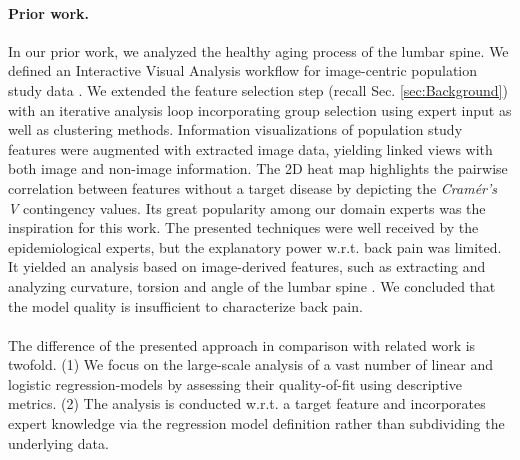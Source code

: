 \documentclass[journal]{style/vgtc} 			          %
\begin{document}
\paragraph{Prior work.}
In our prior work, we analyzed the healthy aging process of the lumbar spine.
We defined an Interactive Visual Analysis workflow for image-centric population study data \cite{Klemm2014VIS}.
We extended the feature selection step (recall Sec. \ref{sec:Background}) with an iterative analysis loop incorporating group selection using expert input as well as clustering methods.
Information visualizations of population study features were augmented with extracted image data, yielding linked views with both image and non-image information.
The 2D heat map \cite{Klemm2014VIS} highlights the pairwise correlation between features without a target disease by depicting the \emph{Cram\'{e}r's V} contingency values.
Its great popularity among our domain experts was the inspiration for this work.
The presented techniques were well received by the epidemiological experts, but the explanatory power w.r.t. back pain was limited.
It yielded an analysis based on image-derived features, such as extracting and analyzing curvature, torsion and angle of the lumbar spine \cite{Klemm2015}.
We concluded that the model quality is insufficient to characterize back pain.
\\\\
The difference of the presented approach in comparison with related work is twofold.
(1) We focus on the large-scale analysis of a vast number of linear and logistic regression-models by assessing their quality-of-fit using descriptive metrics.
(2) The analysis is conducted w.r.t. a target feature and incorporates expert knowledge via the regression model definition rather than subdividing the underlying data.
\end{document}
